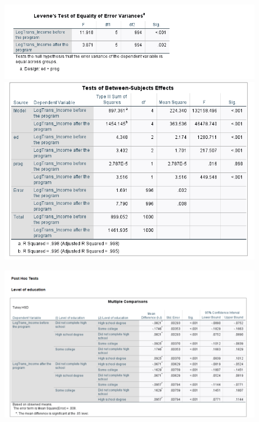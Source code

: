 \documentclass[english,10pt,a4paper]{article}
\begin{document}
		\begin{figure}[h]
			
			
			\includegraphics[width=1\linewidth]{Levene's test1}
			\includegraphics[width=1\linewidth]{Test between subject effect1}
		\end{figure}
		
			\begin{figure}[h]
			
			
			\includegraphics[width=1.2\linewidth]{Multiple comparisonLOG}
		\end{figure}
		
\end{document}
